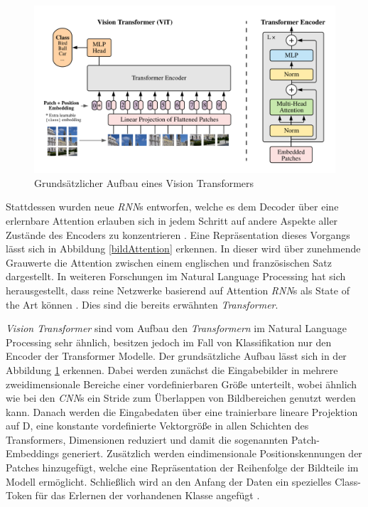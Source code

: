 \documentclass[twoside,a4paper]{IEEEtran}
\begin{document}
\begin{figure}[!htb]
	\centering
	\includegraphics[width=2.1\columnwidth]{vitimg}
	\caption{Grundsätzlicher Aufbau eines Vision Transformers \cite[S.3]{VIT}}
	\label{vitimg}
\end{figure}
Stattdessen wurden neue \emph{RNN}s entworfen, welche es dem Decoder über eine erlernbare Attention erlauben sich in jedem Schritt auf andere Aspekte aller Zustände des Encoders zu konzentrieren \cite[S.4]{RNN_ATTENTION}. Eine Repräsentation dieses Vorgangs lässt sich in Abbildung \ref{bildAttention} erkennen. In dieser wird über zunehmende Grauwerte die Attention zwischen einem englischen und französischen Satz dargestellt. In weiteren Forschungen im Natural Language Processing hat sich herausgestellt, dass reine Netzwerke basierend auf Attention \emph{RNN}s als State of the Art können \cite[S.2]{TRANSFORMERS}. Dies sind die bereits erwähnten \emph{Transformer}.

\emph{Vision Transformer} sind vom Aufbau den \emph{Transformern} im Natural Language Processing sehr ähnlich, besitzen jedoch im Fall von Klassifikation nur den Encoder der Transformer Modelle. Der grundsätzliche Aufbau lässt sich in der Abbildung \ref{vitimg} erkennen. Dabei werden zunächst die Eingabebilder in mehrere zweidimensionale Bereiche einer vordefinierbaren Größe unterteilt, wobei ähnlich wie bei den \emph{CNN}s ein Stride zum Überlappen von Bildbereichen genutzt werden kann. Danach werden die Eingabedaten über eine trainierbare lineare Projektion auf D, eine konstante vordefinierte Vektorgröße in allen Schichten des Transformers, Dimensionen reduziert und damit die sogenannten Patch-Embeddings generiert. Zusätzlich werden eindimensionale Positionskennungen der Patches hinzugefügt, welche eine Repräsentation der Reihenfolge der Bildteile im Modell ermöglicht. Schließlich wird an den Anfang der Daten ein spezielles Class-Token für das Erlernen der vorhandenen Klasse angefügt \cite[S.3]{VIT}. 
\end{document}
